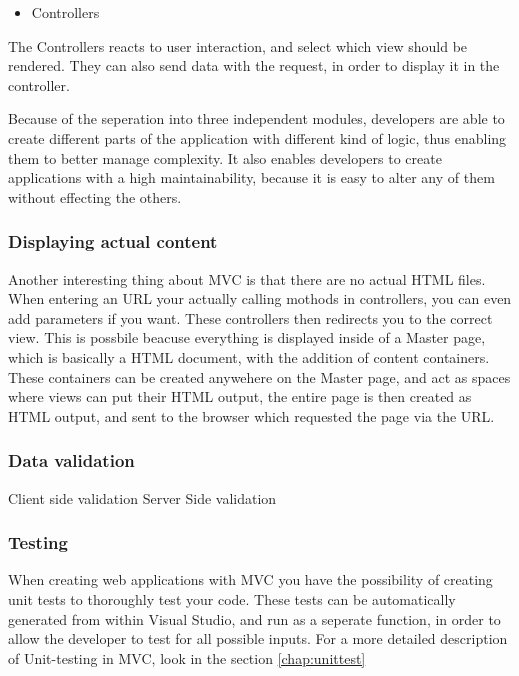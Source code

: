 \begin{itemize}
\item Controllers
\end{itemize}
The Controllers reacts to user interaction, and select which view should be rendered. They can also send data with the request, in order to display it in the controller.

Because of the seperation into three independent modules, developers are able to create different parts of the application with different kind of logic, thus enabling them to better manage complexity. It also enables developers to create applications with a high maintainability, because it is easy to alter any of them without effecting the others.

\subsubsection{Displaying actual content}
Another interesting thing about MVC is that there are no actual HTML files. When entering an URL your actually calling mothods in controllers, you can even add parameters if you want. These controllers then redirects you to the correct view. This is possbile beacuse everything is displayed inside of a Master page, which is basically a HTML document, with the addition of content containers. These containers can be created anywehere on the Master page, and act as spaces where views can put their HTML output, the entire page is then created as HTML output, and sent to the browser which requested the page via the URL.

\subsubsection{Data validation}
Client side validation
Server Side validation

\subsubsection{Testing}
When creating web applications with MVC you have the possibility of creating unit tests to thoroughly test your code. These tests can be automatically generated from within Visual Studio, and run as a seperate function, in order to allow the developer to test for all possible inputs. For a more detailed description of Unit-testing in MVC, look in the section \ref{chap:unittest}
